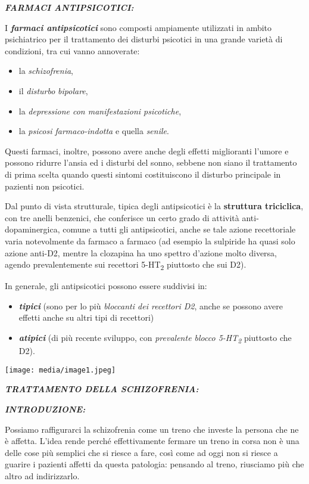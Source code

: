 \documentclass[]{article}
\date{}
\begin{document}
\textbf{\emph{FARMACI ANTIPSICOTICI:}}

I \textbf{\emph{farmaci antipsicotici}} sono composti ampiamente
utilizzati in ambito psichiatrico per il trattamento dei disturbi
psicotici in una grande varietà di condizioni, tra cui vanno annoverate:

\begin{itemize}
\item
  la \emph{schizofrenia},
\item
  il \emph{disturbo} \emph{bipolare},
\item
  la \emph{depressione con manifestazioni psicotiche},
\item
  la \emph{psicosi farmaco-indotta} e quella \emph{senile}.
\end{itemize}

Questi farmaci, inoltre, possono avere anche degli effetti miglioranti
l'umore e possono ridurre l'ansia ed i disturbi del sonno, sebbene non
siano il trattamento di prima scelta quando questi sintomi costituiscono
il disturbo principale in pazienti non psicotici.

Dal punto di vista strutturale, tipica degli antipsicotici è la
\textbf{struttura triciclica}, con tre anelli benzenici, che conferisce
un certo grado di attività anti-dopaminergica, comune a tutti gli
antipsicotici, anche se tale azione recettoriale varia notevolmente da
farmaco a farmaco (ad esempio la sulpiride ha quasi solo azione anti-D2,
mentre la clozapina ha uno spettro d'azione molto diversa, agendo
prevalentemente sui recettori 5-HT\textsubscript{2} piuttosto che sui
D2).

In generale, gli antipsicotici possono essere suddivisi in:

\begin{itemize}
\item
  \textbf{\emph{tipici}} (sono per lo più \emph{bloccanti dei recettori
  D2}, anche se possono avere effetti anche su altri tipi di recettori)
\item
  \textbf{\emph{atipici}} (di più recente sviluppo, con \emph{prevalente
  blocco 5-HT\textsubscript{2}} piuttosto che D2).
\end{itemize}

\texttt{[image: media/image1.jpeg]}

\textbf{\emph{TRATTAMENTO DELLA SCHIZOFRENIA:}}

\textbf{\emph{INTRODUZIONE:}}

Possiamo raffigurarci la schizofrenia come un treno che investe la
persona che ne è affetta. L'idea rende perché effettivamente fermare un
treno in corsa non è una delle cose più semplici che si riesce a fare,
così come ad oggi non si riesce a guarire i pazienti affetti da questa
patologia: pensando al treno, riusciamo più che altro ad indirizzarlo.
\end{document}
